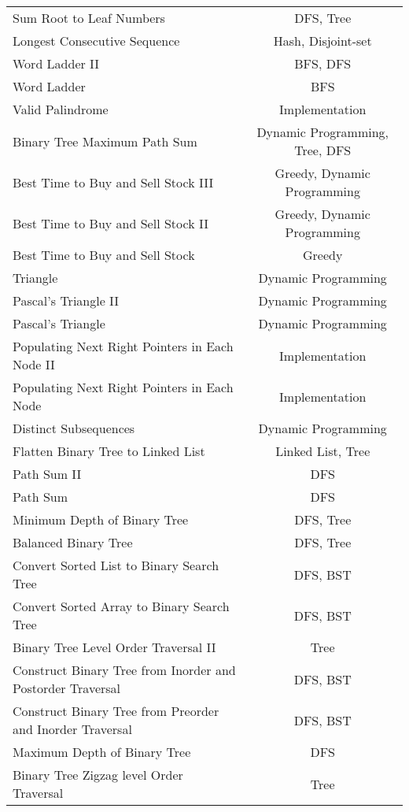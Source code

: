 \documentclass[paper=a4, fontsize=11pt]{scrartcl} %
\begin{document}
\begin{center}
\begin{longtable}{|l|c|}
    Sum Root to Leaf Numbers    &   DFS, Tree   \\
    Longest Consecutive Sequence    &   Hash, Disjoint-set    \\
    Word Ladder II  &   BFS, DFS    \\
    Word Ladder &   BFS \\
    Valid Palindrome    &   Implementation  \\
    Binary Tree Maximum Path Sum    &   Dynamic Programming, Tree, DFS \\
    Best Time to Buy and Sell Stock III &   Greedy, Dynamic Programming \\
    Best Time to Buy and Sell Stock II  &   Greedy, Dynamic Programming \\
    Best Time to Buy and Sell Stock &   Greedy  \\
    Triangle    &   Dynamic Programming    \\
    Pascal's Triangle II    &   Dynamic Programming \\
    Pascal's Triangle   &   Dynamic Programming \\
    Populating Next Right Pointers in Each Node II  &   Implementation  \\
    Populating Next Right Pointers in Each Node &   Implementation  \\
    Distinct Subsequences   &   Dynamic Programming \\
    Flatten Binary Tree to Linked List  &   Linked List, Tree\\
    Path Sum II &   DFS   \\
    Path Sum    &   DFS   \\
    Minimum Depth of Binary Tree    &   DFS, Tree   \\
    Balanced Binary Tree    &   DFS, Tree   \\
    Convert Sorted List to Binary Search Tree   &   DFS, BST \\
    Convert Sorted Array to Binary Search Tree  &   DFS, BST  \\
    Binary Tree Level Order Traversal II    &   Tree  \\
    Construct Binary Tree from Inorder and Postorder Traversal  &   DFS, BST  \\
    Construct Binary Tree from Preorder and Inorder Traversal   &   DFS, BST  \\
    Maximum Depth of Binary Tree    &   DFS   \\
    Binary Tree Zigzag level Order Traversal    &   Tree  \\

\end{longtable}
\end{center}
\end{document}
